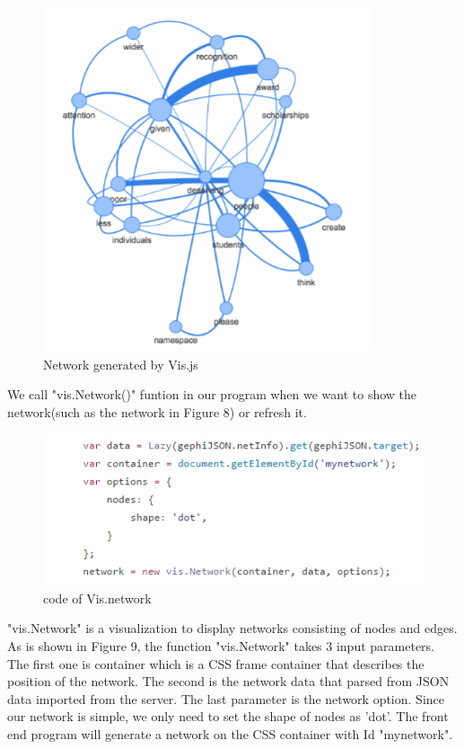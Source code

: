 \begin{figure}[h]
\centering
		\includegraphics[width=\linewidth]{figure/VisNet}
	\caption{Network generated by Vis.js}
	\label{fig:netvis}
\end{figure}

We call "vis.Network()" funtion in our program when we want to show the network(such as the network in Figure 8) or refresh it. 


\begin{figure}[h]
\centering
		\includegraphics[width=\linewidth]{figure/Vis}
	\caption{code of Vis.network}
	\label{fig:vis}
\end{figure}

"vis.Network" is a visualization to display networks consisting of nodes and edges. As is shown in Figure 9, the function "vis.Network" takes 3 input parameters. The first one is container which is a CSS frame container that describes the position of the network. The second is the network data that parsed from JSON data imported from the server. The last parameter is the network option. Since our network is simple, we only need to set the shape of nodes as 'dot'. The front end program will generate a network on the CSS container with Id "mynetwork".